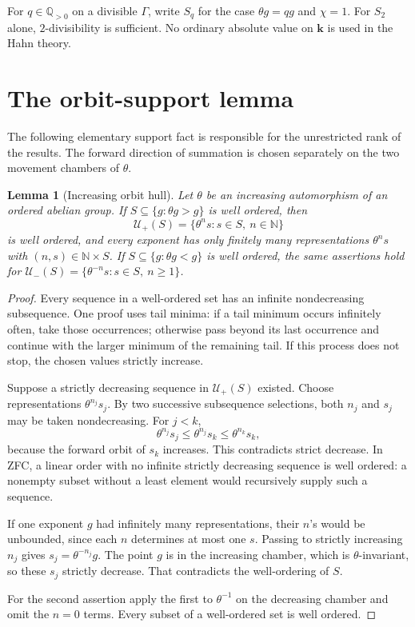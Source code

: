 \documentclass[11pt,oneside]{article}
\numberwithin{equation}{section}
\newtheorem{lemma}[theorem]{Lemma}
\theoremstyle{definition}
\theoremstyle{remark}
\newcommand{\Q}{\mathbb Q}
\newcommand{\N}{\mathbb N}
\newcommand{\kk}{\mathbf k}
\begin{document}
For $q\in\Q_{>0}$ on a divisible $\Gamma$, write $S_q$ for the case
$\theta g=qg$ and $\chi=1$. For $S_2$ alone, $2$-divisibility is sufficient.
No ordinary absolute value on $\kk$ is used in the Hahn theory.

\section{The orbit-support lemma}\label{dsup:sec:orbits}

The following elementary support fact is responsible for the unrestricted
rank of the results. The forward direction of summation is chosen
separately on the two movement chambers of $\theta$.

\begin{lemma}[Increasing orbit hull]\label{dsup:lem:orbit}
Let $\theta$ be an increasing automorphism of an ordered abelian group.
If $S\subseteq\{g:\theta g>g\}$ is well ordered, then
\[
 \mathcal U_+(S)=\{\theta^n s:s\in S,\ n\in\N\}
\]
is well ordered, and every exponent has only finitely many representations
$\theta^n s$ with $(n,s)\in\N\times S$.
If $S\subseteq\{g:\theta g<g\}$ is well ordered, the same assertions hold
for
$\mathcal U_-(S)=\{\theta^{-n}s:s\in S,\ n\ge1\}$.
\end{lemma}
\begin{proof}
Every sequence in a well-ordered set has an infinite nondecreasing
subsequence. One proof uses tail minima: if a tail minimum occurs
infinitely often, take those occurrences; otherwise pass beyond its last
occurrence and continue with the larger minimum of the remaining tail.
If this process does not stop, the chosen values strictly increase.

Suppose a strictly decreasing sequence in $\mathcal U_+(S)$ existed.
Choose representations $\theta^{n_j}s_j$. By two successive subsequence
selections, both $n_j$ and $s_j$ may be taken nondecreasing. For $j<k$,
\[
 \theta^{n_j}s_j\le\theta^{n_j}s_k\le\theta^{n_k}s_k,
\]
because the forward orbit of $s_k$ increases. This contradicts strict
decrease. In ZFC, a linear order with no infinite strictly decreasing
sequence is well ordered: a nonempty subset without a least element
would recursively supply such a sequence.

If one exponent $g$ had infinitely many representations, their $n$'s
would be unbounded, since each $n$ determines at most one $s$. Passing to
strictly increasing $n_j$ gives
$s_j=\theta^{-n_j}g$. The point $g$ is in the increasing chamber, which
is $\theta$-invariant, so these $s_j$ strictly decrease. That contradicts
the well-ordering of $S$.

For the second assertion apply the first to $\theta^{-1}$ on the decreasing
chamber and omit the $n=0$ terms. Every subset of a well-ordered set is
well ordered.
\end{proof}
\end{document}
